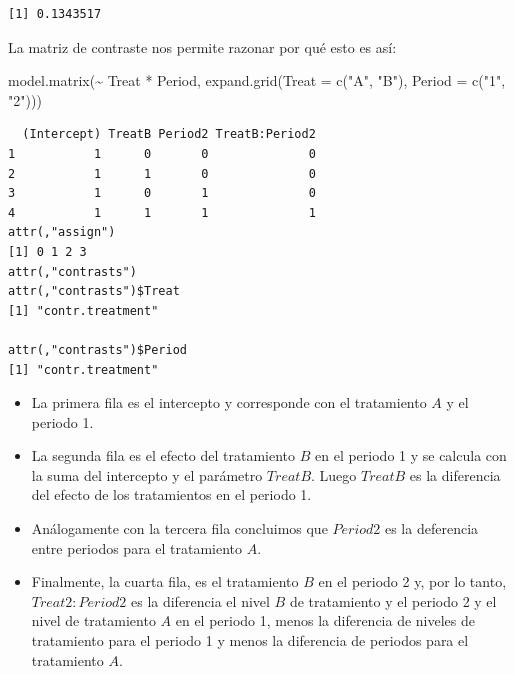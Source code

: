 \documentclass[
  12pt,
  a4paper,
  extrafontsizes,
  onecolumn,
  openright]{memoir}
\newenvironment{Shaded}{\begin{snugshade}}{\end{snugshade}}
\newcommand{\AttributeTok}[1]{\textcolor[rgb]{0.40,0.45,0.13}{#1}}
\newcommand{\FunctionTok}[1]{\textcolor[rgb]{0.28,0.35,0.67}{#1}}
\newcommand{\NormalTok}[1]{\textcolor[rgb]{0.00,0.23,0.31}{#1}}
\newcommand{\SpecialCharTok}[1]{\textcolor[rgb]{0.37,0.37,0.37}{#1}}
\newcommand{\StringTok}[1]{\textcolor[rgb]{0.13,0.47,0.30}{#1}}
\providecommand{\tightlist}{%
  \setlength{\itemsep}{0pt}\setlength{\parskip}{0pt}}\usepackage{longtable,booktabs,array}
\begin{document}
\begin{verbatim}
[1] 0.1343517
\end{verbatim}

\normalsize

La matriz de contraste nos permite razonar por qué esto es así:

\scriptsize

\begin{Shaded}
\begin{Highlighting}[]
\FunctionTok{model.matrix}\NormalTok{(}\SpecialCharTok{\textasciitilde{}}\NormalTok{ Treat }\SpecialCharTok{*}\NormalTok{ Period, }\FunctionTok{expand.grid}\NormalTok{(}\AttributeTok{Treat =} \FunctionTok{c}\NormalTok{(}\StringTok{"A"}\NormalTok{, }\StringTok{"B"}\NormalTok{), }\AttributeTok{Period =} \FunctionTok{c}\NormalTok{(}\StringTok{"1"}\NormalTok{, }\StringTok{"2"}\NormalTok{)))}
\end{Highlighting}
\end{Shaded}

\begin{verbatim}
  (Intercept) TreatB Period2 TreatB:Period2
1           1      0       0              0
2           1      1       0              0
3           1      0       1              0
4           1      1       1              1
attr(,"assign")
[1] 0 1 2 3
attr(,"contrasts")
attr(,"contrasts")$Treat
[1] "contr.treatment"

attr(,"contrasts")$Period
[1] "contr.treatment"
\end{verbatim}

\normalsize

\begin{itemize}
\tightlist
\item
  La primera fila es el intercepto y corresponde con el tratamiento
  \(A\) y el periodo 1.
\item
  La segunda fila es el efecto del tratamiento \(B\) en el periodo 1 y
  se calcula con la suma del intercepto y el parámetro \(TreatB\). Luego
  \(TreatB\) es la diferencia del efecto de los tratamientos en el
  periodo 1.
\item
  Análogamente con la tercera fila concluimos que \(Period2\) es la
  deferencia entre periodos para el tratamiento \(A\).
\item
  Finalmente, la cuarta fila, es el tratamiento \(B\) en el periodo 2 y,
  por lo tanto, \(Treat2:Period2\) es la diferencia el nivel \(B\) de
  tratamiento y el periodo 2 y el nivel de tratamiento \(A\) en el
  periodo 1, menos la diferencia de niveles de tratamiento para el
  periodo 1 y menos la diferencia de periodos para el tratamiento \(A\).
\end{itemize}
\end{document}
